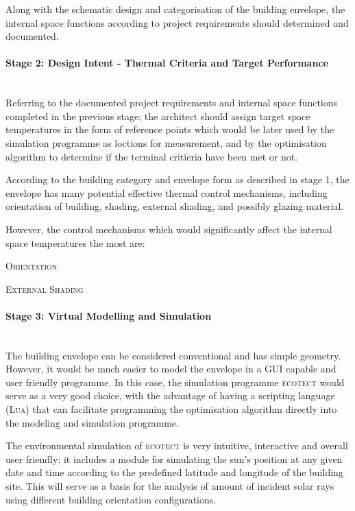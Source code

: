 Along with the schematic design and categorisation of the building envelope, the internal space functions according to project requirements should determined and documented.

\paragraph{Stage 2: Design Intent - Thermal Criteria and Target Performance}\mbox{}\\

Referring to the documented project requirements and internal space functions completed in the previous stage; the architect should assign target space temperatures in the form of reference points which would be later used by the simulation programme as loctions for measurement, and by the optimisation algorithm to determine if the terminal critieria have been met or not.

According to the building category and envelope form as described in stage 1, the envelope has many potential effective thermal control mechanisms, including orientation of building, shading, external shading, and possibly glazing material.

However, the control mechanisms which would significantly affect the internal space temperatures the most are:
\begin{compactenum}
	\item \textsc{Orientation}
	\item \textsc{External Shading}
\end{compactenum}

\paragraph{Stage 3: Virtual Modelling and Simulation}\mbox{}\\

The building envelope can be considered conventional and has simple geometry. However, it would be much easier to model the envelope in a GUI capable and user friendly programme. In this case, the simulation programme \textsc{ecotect} would serve as a very good choice, with the advantage of having a scripting language (\textsc{Lua}) that can facilitate programming the optimisation algorithm directly into the modeling and simulation programme.

The environmental simulation of \textsc{ecotect} is very intuitive, interactive and overall user friendly; it includes a module for simulating the sun's position at any given date and time according to the predefined latitude and longitude of the building site. This will serve as a basis for the analysis of amount of incident solar rays using different building orientation configurations.

